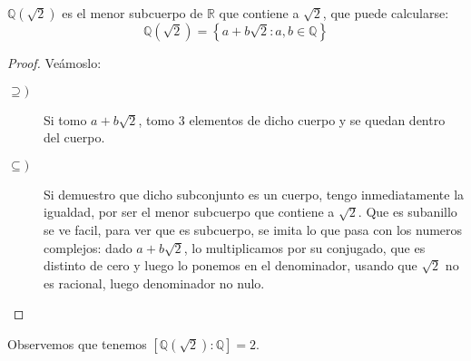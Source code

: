 \begin{ejemplo}
    $\mathbb{Q}(\sqrt{2})$ es el menor subcuerpo de $\mathbb{R}$ que contiene a $\sqrt{2}$, que puede calcularse:
    \begin{equation*}
        \mathbb{Q}(\sqrt{2}) = \left\{a+b\sqrt{2} : a,b\in \mathbb{Q}\right\}
    \end{equation*}
    \begin{proof}
        Veámoslo:
        \begin{description}
            \item [$\supseteq)$] Si tomo $a+b\sqrt{2}$, tomo 3 elementos de dicho cuerpo y se quedan dentro del cuerpo.
            \item [$\subseteq)$] Si demuestro que dicho subconjunto es un cuerpo, tengo inmediatamente la igualdad, por ser el menor subcuerpo que contiene a $\sqrt{2}$. Que es subanillo se ve facil, para ver que es subcuerpo, se imita lo que pasa con los numeros complejos: dado $a+b\sqrt{2}$, lo multiplicamos por su conjugado, que es distinto de cero y luego lo ponemos en el denominador, usando que $\sqrt{2}$ no es racional, luego denominador no nulo.
        \end{description}
    \end{proof}
    Observemos que tenemos $[\mathbb{Q}(\sqrt{2}): \mathbb{Q}] = 2$.
\end{ejemplo}
